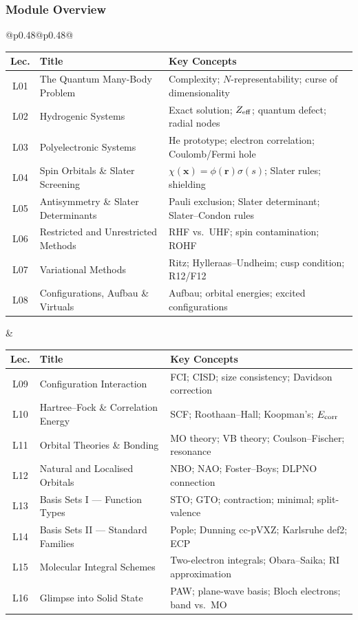 \documentclass[11pt,a4paper]{article}
\begin{document}
\subsubsection*{Module Overview}
\begin{center}
\begin{tabular}{@{}p{}@{\textwidth}p{}@{}}
\begin{tabular}[t]{@{}clp{4.0cm}@{}}
\toprule
\textbf{Lec.} & \textbf{Title} & \textbf{Key Concepts}\\
\midrule
L01 & The Quantum Many-Body Problem & Complexity; $N$-representability; curse of dimensionality\\
L02 & Hydrogenic Systems & Exact solution; $Z_{\rm eff}$; quantum defect; radial nodes\\
L03 & Polyelectronic Systems & He prototype; electron correlation; Coulomb/Fermi hole\\
L04 & Spin Orbitals \& Slater Screening & $\chi(\mathbf{x})=\phi(\mathbf{r})\sigma(s)$; Slater rules; shielding\\
L05 & Antisymmetry \& Slater Determinants & Pauli exclusion; Slater determinant; Slater--Condon rules\\
L06 & Restricted and Unrestricted Methods & RHF vs.\ UHF; spin contamination; ROHF\\
L07 & Variational Methods & Ritz; Hylleraas--Undheim; cusp condition; R12/F12\\
L08 & Configurations, Aufbau \& Virtuals & Aufbau; orbital energies; excited configurations\\
\bottomrule
\end{tabular}
&
\begin{tabular}[t]{@{}clp{4.0cm}@{}}
\toprule
\textbf{Lec.} & \textbf{Title} & \textbf{Key Concepts}\\
\midrule
L09 & Configuration Interaction & FCI; CISD; size consistency; Davidson correction\\
L10 & Hartree--Fock \& Correlation Energy & SCF; Roothaan--Hall; Koopman's; $E_{\rm corr}$\\
L11 & Orbital Theories \& Bonding & MO theory; VB theory; Coulson--Fischer; resonance\\
L12 & Natural and Localised Orbitals & NBO; NAO; Foster--Boys; DLPNO connection\\
L13 & Basis Sets I --- Function Types & STO; GTO; contraction; minimal; split-valence\\
L14 & Basis Sets II --- Standard Families & Pople; Dunning cc-pVXZ; Karlsruhe def2; ECP\\
L15 & Molecular Integral Schemes & Two-electron integrals; Obara--Saika; RI approximation\\
L16 & Glimpse into Solid State & PAW; plane-wave basis; Bloch electrons; band vs.\ MO\\
\bottomrule
\end{tabular}
\\
\end{tabular}
\end{center}
\end{document}
